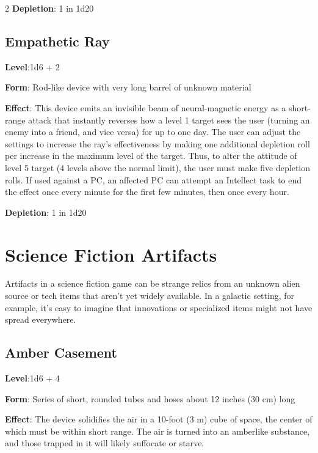 \begin{multicols}{2}
\textbf{Depletion}: 1 in 1d20

\section{Empathetic Ray}

\textbf{Level}:1d6 + 2 

\textbf{Form}: Rod-like device with very long barrel of unknown material 

\textbf{Effect}: This device emits an invisible beam of neural-magnetic energy as a short-range attack that instantly reverses how a level 1 target sees the user (turning an enemy into a friend, and vice versa) for up to one day. The user can adjust the settings to increase the ray’s effectiveness by making one additional depletion roll per increase in the maximum level of the target. Thus, to alter the attitude of level 5 target (4 levels above the normal limit), the user must make five depletion rolls. If used against a PC, an affected PC can attempt an Intellect task to end the effect once every minute for the first few minutes, then once every hour. 

\textbf{Depletion}: 1 in 1d20

\chapter{Science Fiction Artifacts}

Artifacts in a science fiction game can be strange relics from an unknown alien source or tech items that aren’t yet widely available. In a galactic setting, for example, it’s easy to imagine that innovations or specialized items might not have spread everywhere. 

\section{Amber Casement}

\textbf{Level}:1d6 + 4

\textbf{Form}: Series of short, rounded tubes and hoses about 12 inches (30 cm) long

\textbf{Effect}: The device solidifies the air in a 10-foot (3 m) cube of space, the center of which must be within short range. The air is turned into an amberlike substance, and those trapped in it will likely suffocate or starve.


\end{multicols}
